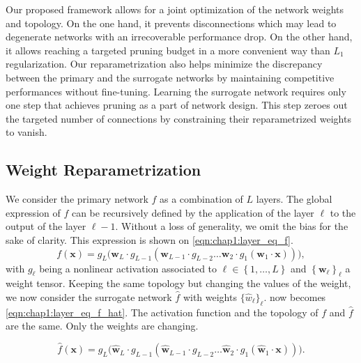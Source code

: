 Our proposed framework allows for a joint optimization of the network weights
and topology. On the one hand, it prevents disconnections which may lead to
degenerate networks with an irrecoverable performance drop. On the other hand,
it allows reaching a targeted pruning budget in a more convenient way than $L_1$
regularization. Our reparametrization also helps minimize the discrepancy
between the primary and the surrogate networks by maintaining competitive
performances without fine-tuning. Learning the surrogate network requires only
one step that achieves pruning as a part of network design. This step zeroes out
the targeted number of connections by constraining their reparametrized weights
to vanish.

\subsection{Weight Reparametrization}
\label{sec:chap1:weight_reparam}

We consider the primary network $f$ as a combination of $L$ layers. The global
expression of $f$ can be recursively defined by the application of the layer $\ell$
to the output of the layer $\ell-1$. Without a loss of generality, we omit the
bias for the sake of clarity. This expression is shown on
\cref{eqn:chap1:layer_eq_f}.
\begin{equation}
\label{eqn:chap1:layer_eq_f}
f(\mathbf{x}) = g_L \big(\mathbf{w}_L \cdot g_{L-1}(\mathbf{w}_{L-1} \cdot g_{L-2} \dots
\mathbf{w}_2 \cdot g_1(\mathbf{w}_1 \cdot \mathbf{x}))\big),
\end{equation}
\noindent with $g_\ell$ being a nonlinear activation associated to $\ell \in
\left\{ 1,\dots, L \right\}$ and $\left\{ \mathbf{w}_\ell \right\}_\ell$ a
weight tensor. Keeping the same topology but changing the values of the weight,
we now consider the surrogate network $\hat{f}$ with weights
$\{\hat{w}_\ell\}_\ell$.  now becomes
\cref{eqn:chap1:layer_eq_f_hat}. The activation function and the topology of $f$
and $\hat{f}$ are the same. Only the weights are changing.

\begin{equation}
\label{eqn:chap1:layer_eq_f_hat}
\hat{f}(\mathbf{x}) = g_L \big(\mathbf{\hat w}_L \cdot g_{L-1}(\mathbf{\hat w}_{L-1} \cdot g_{L-2}
\dots\mathbf{\hat w}_2 \cdot g_1(\mathbf{\hat w}_1 \cdot \mathbf{x}))\big).
\end{equation}

